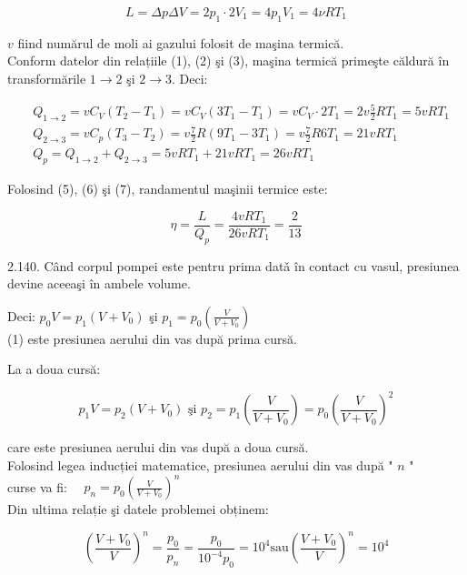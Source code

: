 \begin{equation*}
L=\Delta p \Delta V=2 p_{1} \cdot 2 V_{1}=4 p_{1} V_{1}=4 \nu R T_{1} \tag{6}
\end{equation*}


$v$ fiind numărul de moli ai gazului folosit de maşina termică.\\
Conform datelor din relațiile (1), (2) şi (3), maşina termică primeşte căldură în transformările $1 \rightarrow 2$ şi $2 \rightarrow 3$. Deci:


\begin{align*}
& Q_{1 \rightarrow 2}=v C_{V}\left(T_{2}-T_{1}\right)=v C_{V}\left(3 T_{1}-T_{1}\right)=v C_{V} \cdot 2 T_{1}=2 v \frac{5}{2} R T_{1}=5 v R T_{1} \\
& Q_{2 \rightarrow 3}=v C_{p}\left(T_{3}-T_{2}\right)=v \frac{7}{2} R\left(9 T_{1}-3 T_{1}\right)=v \frac{7}{2} R 6 T_{1}=21 v R T_{1} \\
& Q_{p}=Q_{1 \rightarrow 2}+Q_{2 \rightarrow 3}=5 v R T_{1}+21 v R T_{1}=26 v R T_{1} \tag{7}
\end{align*}


Folosind (5), (6) şi (7), randamentul maşinii termice este:

$$
\eta=\frac{L}{Q_{p}}=\frac{4 v R T_{1}}{26 v R T_{1}}=\frac{2}{13}
$$

2.140. Când corpul pompei este pentru prima datǎ în contact cu vasul, presiunea devine aceeaşi în ambele volume.

Deci: $p_{0} V=p_{1}\left(V+V_{0}\right)$ şi $p_{1}=p_{0}\left(\frac{V}{V+V_{0}}\right)$\\
(1) este presiunea aerului din vas după prima cursă.

La a doua cursă:


\begin{equation*}
p_{1} V=p_{2}\left(V+V_{0}\right) \text { şi } p_{2}=p_{1}\left(\frac{V}{V+V_{0}}\right)=p_{0}\left(\frac{V}{V+V_{0}}\right)^{2} \tag{2}
\end{equation*}


care este presiunea aerului din vas după a doua cursă.\\
Folosind legea inducției matematice, presiunea aerului din vas după " $n$ "\\
curse va fi: $\quad p_{n}=p_{0}\left(\frac{V}{V+V_{0}}\right)^{n}$\\
Din ultima relație şi datele problemei obținem:

$$
\left(\frac{V+V_{0}}{V}\right)^{n}=\frac{p_{0}}{p_{n}}=\frac{p_{0}}{10^{-4} p_{0}}=10^{4} \mathrm{sau}\left(\frac{V+V_{0}}{V}\right)^{n}=10^{4}
$$

